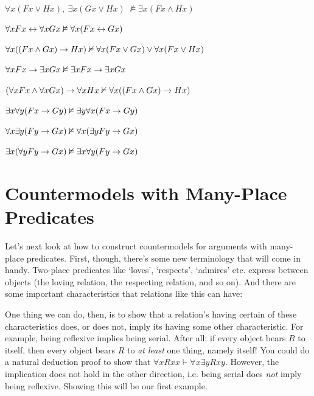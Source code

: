 \begin{earg}
\item $\forall x(Fx \lor Hx), \ \exists x(Gx \lor Hx) \ \nvDash \exists x(Fx \land Hx)$ %
\item $\forall xFx \leftrightarrow \forall x Gx \nvDash \forall x(Fx \leftrightarrow Gx)$ %
\item $\forall x ((Fx \wedge Gx) \rightarrow Hx) \nvDash \forall x(Fx \vee Gx) \vee \forall x(Fx \vee Hx)$ %
\item $\forall xFx \rightarrow \exists xGx \nvDash \exists x Fx \rightarrow \exists x Gx$ %
\item $(\forall x Fx \wedge \forall x Gx) \rightarrow \forall x Hx \nvDash \forall x((Fx \wedge Gx) \rightarrow Hx)$ %
\item $\exists x\forall y(Fx \rightarrow Gy) \nvDash \exists y\forall x(Fx \rightarrow Gy)$
\item $\forall x \exists y(Fy \rightarrow Gx) \nvDash \forall x(\exists yFy \rightarrow Gx)$ %
\item $\exists x(\forall yFy \rightarrow Gx) \nvDash \exists x \forall y(Fy \rightarrow Gx)$
\end{earg}



\section{Countermodels with Many-Place Predicates}

Let's next look at how to construct countermodels for arguments with many-place predicates.  First, though, there's some new terminology that will come in handy.  Two-place predicates like `loves', `respects', `admires' etc. express  between objects (the loving relation, the respecting relation, and so on).  And there are some important characteristics that relations like this can have:

One thing we can do, then, is to show that a relation's having certain of these characteristics does, or does not, imply its having some other characteristic.  For example, being reflexive implies being serial. After all: if every object bears $R$ to itself, then every object bears $R$ to \emph{at least} one thing, namely itself!  You could do a natural deduction proof to show that $\forall x Rxx \vdash \forall x \exists y Rxy$.  However, the implication does not hold in the other direction, i.e. being serial does \emph{not} imply being reflexive.  Showing this will be our first example.

